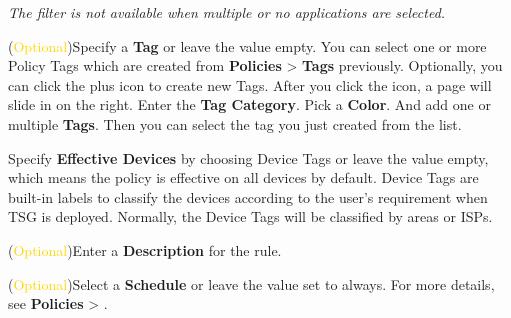 \begin{description}
    
    \notemark\textit{The filter is not available when multiple or no applications are selected.}
    \item[STEP 7.]	(\textcolor{gold}{Optional})Specify a \textbf{Tag} or leave the value empty.
    You can select one or more Policy Tags which are created from \textbf{Policies} > \textbf{Tags} previously. 
    Optionally, you can click the plus icon to create new Tags. After you click the icon, a page will slide in on the right. Enter the \textbf{Tag Category}. 
    Pick a \textbf{Color}. And add one or multiple \textbf{Tags}. Then you can select the tag you just created from the list.
    \item[STEP 8.]	Specify \textbf{Effective Devices} by choosing Device Tags or leave the value empty, which means the policy is effective on all devices by default. 
    Device Tags are built-in labels to classify the devices according to the user’s requirement when TSG is deployed. Normally, the Device Tags will be classified by areas or ISPs.
    \item[STEP 9.]	(\textcolor{gold}{Optional})Enter a \textbf{Description} for the rule.
    \item[STEP 10.]	(\textcolor{gold}{Optional})Select a \textbf{Schedule} or leave the value set to always. For more details, see \textbf{Policies} > \textbf{\hyperlink{link:Schedules}{\color{linkblue}{Schedules}}}.
    

\end{description}
